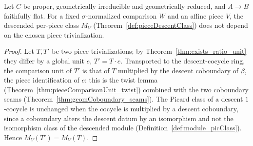\begin{theorem}
  \label{thm:pieceDescentClass_congr}
  \leanok
  Let \(C\) be proper, geometrically irreducible and geometrically reduced, and \(A \to B\)
  faithfully flat. For a fixed \(\sigma\)-normalized comparison \(W\) and an affine piece \(V\), the
  descended per-piece class \(M_V\) (Theorem~\ref{def:pieceDescentClass}) does not depend on the
  chosen piece trivialization.
\end{theorem}
\begin{proof}
  \leanok
  Let \(T, T'\) be two piece trivializations; by Theorem~\ref{thm:exists_ratio_unit} they differ by a
  global unit \(e\), \(T' = T \cdot e\). Transported to the descent-cocycle ring, the comparison unit
  of \(T'\) is that of \(T\) multiplied by the descent coboundary of \(\beta\), the piece
  identification of \(e\): this is the twist lemma (Theorem~\ref{thm:pieceComparisonUnit_twist})
  combined with the two coboundary seams (Theorem~\ref{thm:geomCoboundary_seams}). The Picard class
  of a descent \(1\)-cocycle is unchanged when the cocycle is multiplied by a descent coboundary,
  since a coboundary alters the descent datum by an isomorphism and not the isomorphism class of the
  descended module (Definition~\ref{def:module_picClass}). Hence \(M_V(T') = M_V(T)\).
\end{proof}

